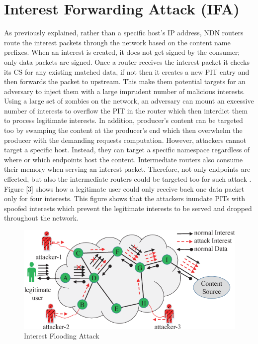 \documentclass[conference]{IEEEtran}
\begin{document}
   



\section{Interest Forwarding Attack (IFA)}

As previously explained, rather than a specific host’s IP address, NDN routers route the interest packets through the network based on the content name prefixes. When an interest is created, it does not get signed by the consumer; only data packets are signed\cite{Gasti2013}. Once a router receives the interest packet it checks its CS for any existing matched data, if not then it creates a new PIT entry and then forwards the packet to upstream. This make them potential targets for an adversary to inject them with a large imprudent number of malicious interests. Using a large set of zombies on the network, an adversary can mount an excessive number of interests to overflow the PIT in the router which then interdict them to process legitimate interests. In addition, producer's content can be targeted too by swamping the content at the producer's end which then overwhelm the producer with the demanding requests computation. However, attackers cannot target a specific host. Instead, they can target a specific namespace regardless of where or which endpoints host the content. Intermediate routers also consume their memory when serving an interest packet. Therefore, not only endpoints are effected, but also the intermediate routers could be targeted too for such attack \cite{6663516}\cite{KARAMI20151262}. Figure [3] shows how a legitimate user could only receive back one data packet only for four interests. This figure shows that the attackers inundate PITs with spoofed interests which prevent the legitimate interests to be served and dropped throughout the network.  

\begin{figure} [ht]
    \centering
    \includegraphics[width=\columnwidth]{IFA.png}
    \caption{\small Interest Flooding Attack  \cite{Xin2016ANI} }
    \label{fig:my_label2}
\end{figure}
\end{document}
